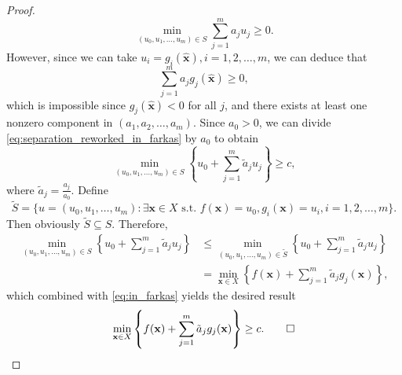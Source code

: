 \documentclass[10pt,a4paper]{article}
\begin{document}
\begin{proof}
\begin{equation*}
	\min_{(u_0, u_1, \ldots, u_m) \in S} \sum_{j=1}^{m} a_j u_j \geq 0.
\end{equation*}
However, since we can take $u_i = g_i(\hat{\mathbf{x}}), i = 1, 2, \ldots, m$, we can deduce that
\begin{equation*}
	\sum_{j=1}^{m} a_j g_j(\hat{\mathbf{x}}) \geq 0,
\end{equation*}
which is impossible since $g_j(\hat{\mathbf{x}}) < 0$ for all $j$, and there exists at least one nonzero component in $(a_1, a_2, \ldots, a_m)$. Since $a_0 > 0$, we can divide \eqref{eq:separation_reworked_in_farkas} by $a_0$ to obtain
\begin{equation}\label{eq:in_farkas}
	\min_{(u_0, u_1, \ldots, u_m) \in S} \left\{ u_0 + \sum_{j=1}^{m} \tilde{a}_j u_j \right\} \geq c,
\end{equation}
where $\tilde{a}_j = \frac{a_j}{a_0}$. Define
\begin{equation*}
	\tilde{S} = \{u = (u_0, u_1, \ldots, u_m) : \exists \mathbf{x} \in X \text{ s.t. } f(\mathbf{x}) = u_0, g_i(\mathbf{x}) = u_i, i = 1, 2, \ldots, m\}.
\end{equation*}
Then obviously $\tilde{S} \subseteq S$. Therefore,
\begin{align*}
	\min_{(u_0, u_1, \ldots, u_m) \in S} \left\{ u_0 + \sum_{j=1}^{m} \tilde{a}_j u_j \right\} &\leq \min_{(u_0, u_1, \ldots, u_m) \in \tilde{S}} \left\{ u_0 + \sum_{j=1}^{m} \tilde{a}_j u_j \right\} \\
	&= \min_{\mathbf{x} \in X} \left\{ f(\mathbf{x}) + \sum_{j=1}^{m} \tilde{a}_j g_j(\mathbf{x}) \right\},
\end{align*}
which combined with \eqref{eq:in_farkas} yields the desired result
\begin{equation*}
	\min_{\mathbf{x} \in X} \left\{ f(\mathbf{x}) + \sum_{j=1}^{m} \tilde{a}_j g_j(\mathbf{x}) \right\} \geq c. \qed
\end{equation*}
\end{proof}
\end{document}
